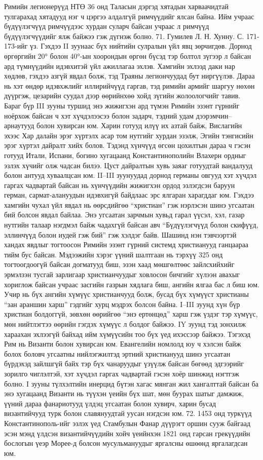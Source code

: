 Римийн легионерүүд НТӨ 36 онд Таласын дэргэд хятадын харваачидтай тулгарахад хятадууд нэг ч цэргээ алдалгүй римчүүдийг ялсан байна. Ийм учраас бүдүүлэгчүүд римчүүдээс хурдан суларч байсан учраас л римчүүд бүдүүлэгчүүдийг ялж байжээ гэж дүгнэж болно. 71. Гумилев Л. Н. Хунну. С. 171-173-ийг үз.
Гэхдээ II зуунаас бүх нийтийн сулралын үйл явц зөрчигдөв. Дорнод өргөргийн 20° болон 40°-ын хоорондын өргөн бүсэд тэр болтол зүгээр л байсан ард түмнүүдийн идэвхитэй үйл ажиллагаа эхлэв. Хамгийн эхлээд даки нар хөдлөв, гэхдээ азгүй явдал болж, тэд Траяны легиончуудад бут ниргүүлэв. Дараа нь хэт өндөр идэвхжлийг иллирийчүүд гаргав, тэд римийн армийг шаргуу нөхөн дүүргэж, цезарийн суудал дээр өөрийнхөө хойд зүгийн жолоологчийг тавив. Бараг бүр III зууны туршид энэ жижигхэн ард түмэн Римийн эзэнт гүрнийг ноёрхож байсан ч хэт хүчдэлээсээ болон задарч, тэдний удам дээрэмчин–арнаутууд болон хувирсан юм. Харин готууд илүү их азтай байж, Вислагийн эхээс Хар далайн эрэг хүртэлх асар том нутгийг хурдан эзэлж, Эгийн тэнгисийн эрэг хүртэл дайралт хийх болов. Тэдэнд хүнчүүд өгсөн цохилтын дараа ч гэсэн готууд Итали, Испани, богино хугацаанд Константинополийн Влахерн ордныг эзлэх хүчийг олж чадсан билээ. Цуст дайралтын хувь заяаг готуудтай вандалууд болон антууд хуваалцсан юм. II–III зуунуудад дорнод германы овгууд хэт хүчдэл гаргах чадвартай байсан нь хүнчүүдийн жижигхэн ордод эзлэгдсэн баруун герман, сармат-алануудын идэвхигүй байдлаас эрс ялгаран харагддаг юм.
Гэхдээ хамгийн чухал үйл явдал нь өөрсдийгөө “христиан” гэж нэрлэсэн шинэ угсаатан бий болсон явдал байлаа. Энэ угсаатан зарчмын хувьд гарал үүсэл, хэл, газар нутгийн талаар нэгдмэл байж чадахгүй байсан авч “Бүдүүлэгчүүд болон скифүүд, эллинчүүд болон иудей гэж бий” гэж хэлдэг байв. Шашинд нэн тэвчээртэй хандах явдлыг тогтоосон Римийн эзэнт гүрний системд христианууд ганцаараа тийм бус байсан. Мэдээжийн хэрэг үүний шалтгаан нь тэрхүү 325 онд тогтоогдоогүй байсан догматууд биш, эзэн хаад мөшгөлтөөс зайлсхийхийг эрмэлзэн тусгай зарлигаар христианчуудыг ховлосон бичгийг хүлээн авахыг хориглож байсан учраас засгийн газрын хядлага биш, ангийн ялгаа бас л биш юм. Учир нь бүх ангийн хүмүүс христианчууд болж, бусад бүх хүмүүст христианы “зан араншин харш” гэдгийг хурц мэдрэх болсон байна. I–III зуунд хүн бүр христиан болдоггүй, зөвхөн өөрийгөө “энэ ертөнцөд” харш гэж үздэг тэр хүмүүс, мөн нийтлэгтээ өөрийн гэгдэх хүмүүс л болдог байжээ. IY зуунд тэд зонхилж хараахан эхлээгүй байхад ийм хүмүүсийн тоо бүх үед ихэссээр байжээ. Тэгэхэд Рим нь Византи болон хувирсан юм.
Евангелийн номлолд юу ч хэлсэн байж болох боловч угсаатны нийлэгжилтэд эртний христианууд шинэ угсаатан бүрдэхэд зайлшгүй байх тэр бүх чанаруудыг үзүүлж байсан бөгөөд эдгээрийг зорилго чиглэлтэй, хэт хүчдэл гаргах чадвартай гэсэн хоёр шинжид нэгтгэж болно. I зууны түлхэлтийн инерцид бүтэн хагас мянган жил хангалттай байсан ба энэ хугацаанд Византи нь түүхэн үеийн бүх шат, мөн буурах шатыг дамжиж, үүний дараа фанариотууд үлдэц угсаатан болон хувирч, харин бусад византийчууд турк болон славянуудтай уусан нэгдсэн юм. 72. 1453 онд туркүүд Константинополь-ийг эзлэх үед Стамбулын Фанар дүүрэгт оршин сууж байгаад эсэн мэнд үлдсэн византийчүүдийн хойч үеийнхэн 1821 онд гарсан грекүүдийн бослогын үеэр Морее-д болсон мусульмануудыг яргалсны өшөөнд яргалагдсан юм.
